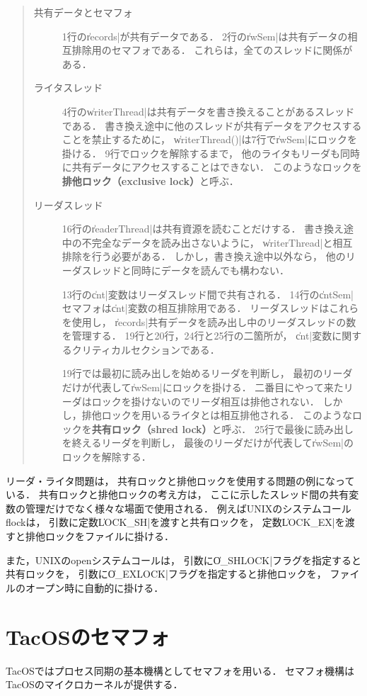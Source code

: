 \begin{quote}
\begin{description}
\item [共有データとセマフォ]
1行の\|records|が共有データである．
2行の\|rwSem|は共有データの相互排除用のセマフォである．
これらは，全てのスレッドに関係がある．

\item [ライタスレッド]
4行の\|writerThread|は共有データを書き換えることがあるスレッドである．
書き換え途中に他のスレッドが共有データをアクセスすることを禁止するために，
\|writerThread()|は7行で\|rwSem|にロックを掛ける．
9行でロックを解除するまで，
他のライタもリーダも同時に共有データにアクセスすることはできない．
このようなロックを{\bf 排他ロック（exclusive lock）}と呼ぶ．

\item [リーダスレッド]
16行の\|readerThread|は共有資源を読むことだけする．
書き換え途中の不完全なデータを読み出さないように，
\|writerThread|と相互排除を行う必要がある．
しかし，書き換え途中以外なら，
他のリーダスレッドと同時にデータを読んでも構わない．

13行の\|cnt|変数はリーダスレッド間で共有される．
14行の\|cntSem|セマフォは\|cnt|変数の相互排除用である．
リーダスレッドはこれらを使用し，
\|records|共有データを読み出し中のリーダスレッドの数を管理する．
19行と20行，24行と25行の二箇所が，
\|cnt|変数に関するクリティカルセクションである．

19行では最初に読み出しを始めるリーダを判断し，
最初のリーダだけが代表して\|rwSem|にロックを掛ける．
二番目にやって来たリーダはロックを掛けないのでリーダ相互は排他されない．
しかし，排他ロックを用いるライタとは相互排他される．
このようなロックを{\bf 共有ロック（shred lock）}と呼ぶ．
25行で最後に読み出しを終えるリーダを判断し，
最後のリーダだけが代表して\|rwSem|のロックを解除する．
\end{description}
\end{quote}

リーダ・ライタ問題は，
共有ロックと排他ロックを使用する問題の例になっている．
共有ロックと排他ロックの考え方は，
ここに示したスレッド間の共有変数の管理だけでなく様々な場面で使用される．
例えばUNIXのシステムコールflockは，
引数に定数\|LOCK_SH|を渡すと共有ロックを，
定数\|LOCK_EX|を渡すと排他ロックをファイルに掛ける．

また，UNIXのopenシステムコールは，
引数に\|O_SHLOCK|フラグを指定すると共有ロックを，
引数に\|O_EXLOCK|フラグを指定すると排他ロックを，
ファイルのオープン時に自動的に掛ける．

\section{TacOSのセマフォ}
TacOSではプロセス同期の基本機構としてセマフォを用いる．
セマフォ機構はTacOSのマイクロカーネルが提供する．

